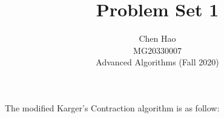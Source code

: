 \documentclass[12pt]{article}
\newenvironment{solution}[2][Solution]{\begin{trivlist}
\item[\hskip \labelsep {\bfseries #1}\hskip \labelsep {\bfseries #2.}]}{\end{trivlist}}
\begin{document}

\title{Problem Set 1}%
\author{Chen Hao \\ MG20330007\\ %
    Advanced Algorithms (Fall 2020)} %

\maketitle

\begin{solution}{1} %
    The modified Karger's Contraction algorithm is as follow:


\end{solution}
\end{document}
